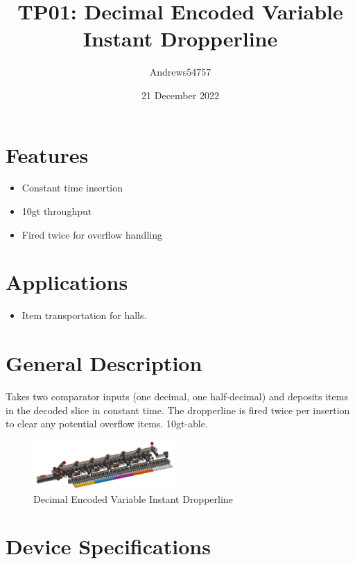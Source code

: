 \documentclass[10pt]{datasheet}
\title{TP01: Decimal Encoded Variable Instant Dropperline}
\author{Andrews54757}
\date{21 December 2022}
\begin{document}
\maketitle

\section{Features}

\begin{itemize}
\item{Constant time insertion}
\item{10gt throughput}
\item{Fired twice for overflow handling}
\end{itemize}

\section{Applications}

\begin{itemize}
\item{Item transportation for halls.}
\end{itemize}

\section{General Description}
Takes two comparator inputs (one decimal, one half-decimal) and deposits items in the decoded slice in constant time. The dropperline is fired twice per insertion to clear any potential overflow items. 10gt-able.

\vfill\break

\begin{figure}[h]
    \centering
    \includegraphics[width=0.48\textwidth]{vardrop2.png}
    \caption{\centering Decimal Encoded Variable Instant Dropperline}
\end{figure}

\onecolumn

\section{Device Specifications}
\end{document}
